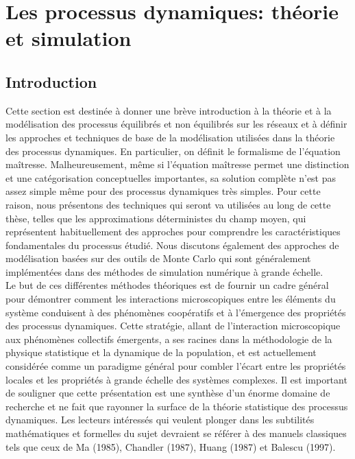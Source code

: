 \section{Les processus dynamiques: théorie et simulation}

\subsection{Introduction}

Cette section est destinée à  donner une brève introduction à la théorie et à la modélisation des processus équilibrés et non équilibrés sur les réseaux et à définir les approches et techniques de base de la modélisation utilisées dans la théorie des processus dynamiques. En particulier, on définit le formalisme de l'équation maîtresse. Malheureusement, même si l'équation maîtresse permet une distinction et une catégorisation conceptuelles importantes, sa solution complète n'est pas assez simple même pour des processus dynamiques très simples. Pour cette raison, nous présentons des techniques qui seront va utilisées au long de cette thèse, telles que les approximations déterministes du champ moyen, qui représentent habituellement des approches pour comprendre les caractéristiques fondamentales du processus étudié. Nous discutons également des approches de modélisation basées sur des outils de Monte Carlo qui sont généralement implémentées dans des méthodes de simulation numérique à grande échelle.\\ 

Le but de ces différentes méthodes théoriques est de fournir un cadre général pour démontrer comment les interactions microscopiques entre les éléments du système conduisent à des phénomènes coopératifs et à l'émergence des propriétés des processus dynamiques. Cette stratégie, allant de l'interaction microscopique aux phénomènes collectifs émergents, a ses racines dans la méthodologie de la physique statistique et la dynamique de la population, et est actuellement considérée comme un paradigme général pour combler l'écart entre les propriétés locales et les propriétés à grande échelle des systèmes complexes. Il est important de souligner que cette présentation est une synthèse d'un énorme domaine de recherche et ne fait que rayonner la surface de la théorie statistique des processus dynamiques. Les lecteurs intéressés qui veulent plonger dans les subtilités mathématiques et formelles du sujet devraient se référer à des manuels classiques tels que ceux de Ma (1985), Chandler (1987), Huang (1987) et Balescu (1997).
